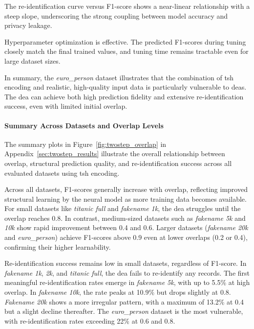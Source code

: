 The re-identification curve versus F1-score shows a near-linear relationship with a steep slope, underscoring the strong coupling between model accuracy and privacy leakage.

Hyperparameter optimization is effective.
The predicted F1-scores during tuning closely match the final trained values, and tuning time remains tractable even for large dataset sizes.

In summary, the \textit{euro\_person} dataset illustrates that the combination of \ac{tsh} encoding and realistic, high-quality input data is particularly vulnerable to \ac{dea}s.
The \ac{dea} can achieve both high prediction fidelity and extensive re-identification success, even with limited initial overlap.

\paragraph{Summary Across Datasets and Overlap Levels}

The summary plots in Figure~\ref{fig:twostep_overlap} in Appendix~\ref{sec:twostep_results} illustrate the overall relationship between overlap, structural prediction quality, and re-identification success across all evaluated datasets using \ac{tsh} encoding.

Across all datasets, F1-scores generally increase with overlap, reflecting improved structural learning by the neural model as more training data becomes available.
For small datasets like \textit{titanic full} and \textit{fakename 1k}, the \ac{dea} struggles until the overlap reaches 0.8.
In contrast, medium-sized datasets such as \textit{fakename 5k} and \textit{10k} show rapid improvement between 0.4 and 0.6.
Larger datasets (\textit{fakename 20k} and \textit{euro\_person}) achieve F1-scores above 0.9 even at lower overlaps (0.2 or 0.4), confirming their higher learnability.

Re-identification success remains low in small datasets, regardless of F1-score.
In \textit{fakename 1k}, \textit{2k}, and \textit{titanic full}, the \ac{dea} fails to re-identify any records.
The first meaningful re-identification rates emerge in \textit{fakename 5k}, with up to 5.5\% at high overlap.
In \textit{fakename 10k}, the rate peaks at 10.9\% but drops slightly at 0.8.
\textit{Fakename 20k} shows a more irregular pattern, with a maximum of 13.2\% at 0.4 but a slight decline thereafter.
The \textit{euro\_person} dataset is the most vulnerable, with re-identification rates exceeding 22\% at 0.6 and 0.8.

